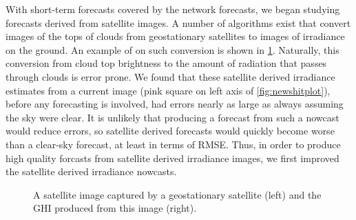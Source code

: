 With short-term forecasts covered by the network forecasts, we began
studying forecasts derived from satellite images.
A number of algorithms exist that convert images of the tops of clouds
from geostationary satellites to images of irradiance on the ground.
An example of on such conversion is shown in
\cref{fig:satimage_example}.
Naturally, this conversion from cloud top brightness to the amount of
radiation that passes through clouds is error prone.
We found that these satellite derived irradiance estimates from a
current image (pink square on left axis of \cref{fig:newshitplot}),
before any forecasting is involved, had errors nearly as large as
always assuming the sky were clear.
It is unlikely that producing a forecast from such a nowcast would
reduce errors, so satellite derived forecasts would quickly become
worse than a clear-sky forecast, at least in terms of RMSE.
Thus, in order to produce high quality forcasts from satellite derived
irradiance images, we first improved the satellite derived irradiance
nowcasts.

\begin{figure}[h]
\caption[Satellite image and irradiance estimate]{A satellite image
  captured by a geostationary satellite (left) and the GHI produced
  from this image (right).}
\label{fig:satimage_example}
\end{figure}

